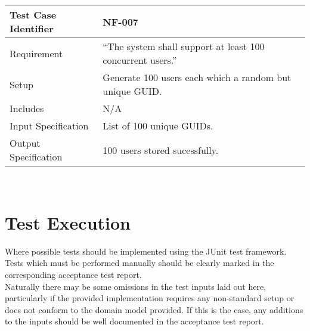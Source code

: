 \documentclass{l3deliverable}
\begin{document}
\begin{tabular}{lp{10cm}}
\hline 
\textbf{Test Case Identifier} & NF-007\tabularnewline
\hline 
\hline 
Requirement & ``The system shall support at least 100 concurrent users.'' \tabularnewline
\hline 
Setup & Generate 100 users each which a random but unique GUID. \tabularnewline
\hline 
Includes & N/A \tabularnewline
\hline 
Input Specification &  List of 100 unique GUIDs. \tabularnewline
\hline 
Output Specification & 100 users stored sucessfully. \tabularnewline
\hline 
\end{tabular}\\

\section{Test Execution}
Where possible tests  should be implemented using the JUnit test framework. Tests which must be performed manually should be clearly marked in the corresponding 
acceptance test report.\\
Naturally there may be some omissions in the test inputs laid out here, particularly if the provided implementation requires any non-standard setup or does not conform to the domain model provided. If this is the case, any additions to the inputs should be well documented in the acceptance test report. 
\end{document}
